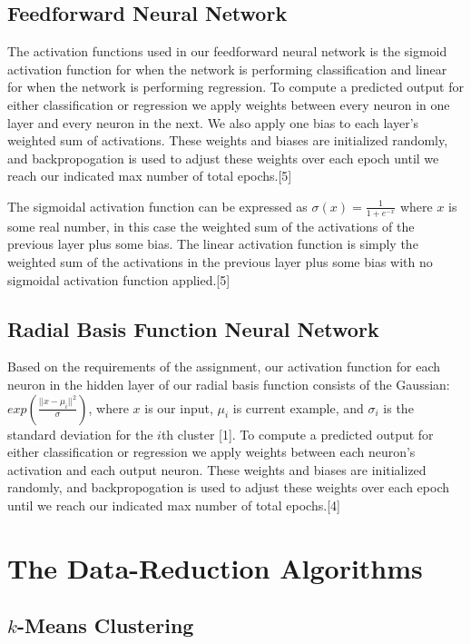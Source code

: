 \documentclass[twoside,11pt]{article}
\begin{document}
\subsection{Feedforward Neural Network}
The activation functions used in our feedforward neural network is the sigmoid activation function for when the network is performing classification and linear for when the network is performing regression. To compute a predicted output for either classification or regression we apply weights between every neuron in one layer and every neuron in the next. We also apply one bias to each layer's weighted sum of activations. These weights and biases are initialized randomly, and backpropogation is used to adjust these weights over each epoch until we reach our indicated max number of total epochs.[5]

The sigmoidal activation function can be expressed as $\sigma(x) = \frac{1}{1 + e^{-x}}$ where $x$ is some real number, in this case the weighted sum of the activations of the previous layer plus some bias. The linear activation function is simply the weighted sum of the activations in the previous layer plus some bias with no sigmoidal activation function applied.[5]

\subsection{Radial Basis Function Neural Network}
Based on the requirements of the assignment, our activation function for each neuron in the hidden layer of our radial basis function consists of the Gaussian: $exp(\frac{||x-\mu_i||^2}{\sigma})$, where $x$ is our input, $\mu_i$ is current example, and $\sigma_i$ is the standard deviation for the $i$th cluster [1]. To compute a predicted output for either classification or regression we apply weights between each neuron's activation and each output neuron. These weights and biases are initialized randomly, and backpropogation is used to adjust these weights over each epoch until we reach our indicated max number of total epochs.[4]

\section{The Data-Reduction Algorithms}

\subsection{$k$-Means Clustering}
\end{document}
